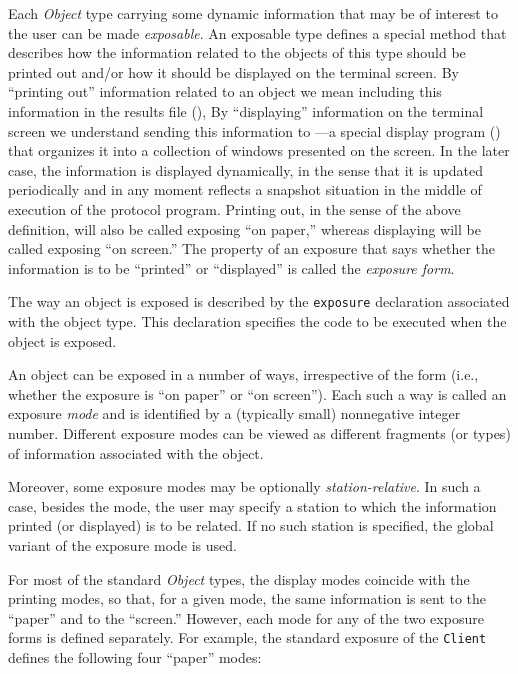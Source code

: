 Each {\em Object\/} type
carrying some dynamic information that may be of interest
to the user can be made {\em exposable}.
An exposable type defines a special method that describes how the
information related to the objects of this type
should be printed out and/or how it
should be displayed on the terminal screen.
By ``printing out'' information related to an object we mean
including this information in the results file (),
By ``displaying'' information on the terminal screen we understand
sending this information to \dsd---a special
display program () that organizes it into a
collection of windows presented on the screen.
In the later case, the information is displayed dynamically, in the sense
that it is updated periodically and in any moment reflects a snapshot
situation in the middle of execution of the protocol program.
Printing out, in the sense of the above definition, will also be called
exposing ``on paper,'' whereas displaying
will be called exposing ``on screen.''
The property of an exposure that says whether the information is to be
``printed'' or ``displayed'' is called the {\em exposure form}.

The way an object is exposed is described by the {\tt exposure} declaration
associated with the object type.
This declaration specifies the code to be executed when the object is
exposed.

An object can be exposed in a number of ways, irrespective of the form (i.e.,
whether the exposure is ``on paper'' or ``on screen'').
Each such a way is called an exposure {\em mode\/} and is identified by
a (typically small) nonnegative integer number.
Different exposure modes can be viewed as different fragments (or types)
of information associated with the object.

Moreover, some exposure modes may be optionally {\em station-relative}.
In such a case, besides the mode, the user may specify a station to
which the information printed (or displayed) is to be related.
If no such station is specified, the global variant of the exposure
mode is used.

For most of the standard {\em Object\/} types, the display modes
coincide with the printing modes, so that, for a given mode,
the same information is sent to the ``paper'' and to the ``screen.''
However, each mode for any of the two exposure forms is defined
separately.
For example, the standard exposure of the {\tt Client} defines the following
four ``paper'' modes:

\medskip

